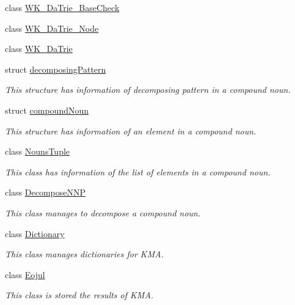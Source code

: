\begin{CompactItemize}
class \hyperlink{classkmaOrange_1_1WK__DaTrie__BaseCheck}{WK\_\-DaTrie\_\-BaseCheck}
\item 
class \hyperlink{classkmaOrange_1_1WK__DaTrie__Node}{WK\_\-DaTrie\_\-Node}
\item 
class \hyperlink{classkmaOrange_1_1WK__DaTrie}{WK\_\-DaTrie}
\item 
struct \hyperlink{structkmaOrange_1_1decomposingPattern}{decomposingPattern}
\begin{CompactList}\small\item\em This structure has information of decomposing pattern in a compound noun. \item\end{CompactList}\item 
struct \hyperlink{structkmaOrange_1_1compoundNoun}{compoundNoun}
\begin{CompactList}\small\item\em This structure has information of an element in a compound noun. \item\end{CompactList}\item 
class \hyperlink{classkmaOrange_1_1NounsTuple}{NounsTuple}
\begin{CompactList}\small\item\em This class has information of the list of elements in a compound noun. \item\end{CompactList}\item 
class \hyperlink{classkmaOrange_1_1DecomposeNNP}{DecomposeNNP}
\begin{CompactList}\small\item\em This class manages to decompose a compound noun. \item\end{CompactList}\item 
class \hyperlink{classkmaOrange_1_1Dictionary}{Dictionary}
\begin{CompactList}\small\item\em This class manages dictionaries for KMA. \item\end{CompactList}\item 
class \hyperlink{classkmaOrange_1_1Eojul}{Eojul}
\begin{CompactList}\small\item\em This class is stored the results of KMA. \item\end{CompactList}\item 

\end{CompactItemize}
